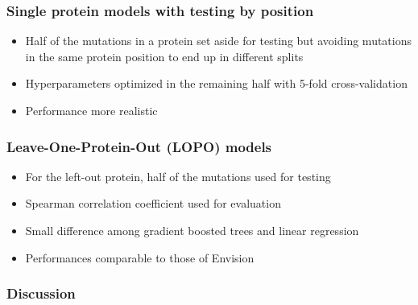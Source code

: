 \documentclass[10pt, british]{beamer}
\begin{document}
\begin{frame}
	\frametitle{Single protein models with testing by position}
	\begin{itemize}
		\item Half of the mutations in a protein set aside for testing but avoiding mutations in the same protein position to end up in different splits
		\item Hyperparameters optimized in the remaining half with 5-fold cross-validation
		\item Performance more realistic
	\end{itemize}
	\vfill%
	\centering%
	
\end{frame}

\begin{frame}
	\frametitle{Leave-One-Protein-Out (LOPO) models}
	\begin{itemize}
		\item For the left-out protein, half of the mutations used for testing
		\item Spearman correlation coefficient used for evaluation
		\item Small difference among gradient boosted trees and linear regression
		\item Performances comparable to those of Envision
	\end{itemize}
	\vfill%
	\centering%
	
\end{frame}

\begin{frame}
	\frametitle{Discussion}
	\begin{figure}
	\end{figure}
\end{frame}
\end{document}
